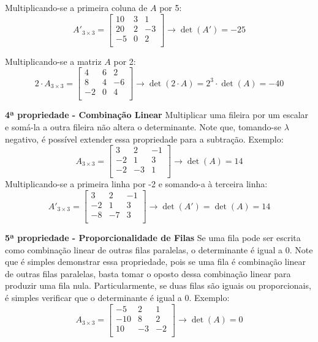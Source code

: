 \documentclass[
  portuguese,
  letterpaper,
  DIV=11,
  numbers=noendperiod]{scrreport}
\begin{document}
Multiplicando-se a primeira coluna de \(A\) por 5: \[
A'_{3\times3} =
\begin{bmatrix}
    10 & 3 & 1  \\
    20 & 2 & -3 \\
    -5 & 0 & 2 \\
\end{bmatrix}
\rightarrow \det(A') = -25
\]

Multiplicando-se a matriz \(A\) por 2: \[
2\cdot A_{3\times3} =
\begin{bmatrix}
    4 & 6 & 2  \\
    8 & 4 & -6 \\
    -2 & 0 & 4 \\
\end{bmatrix}
\rightarrow \det(2 \cdot A) = 2^3 \cdot \det(A) = -40
\]

\textbf{4ª propriedade - Combinação Linear} Multiplicar uma fileira por
um escalar e somá-la a outra fileira não altera o determinante. Note
que, tomando-se \(\lambda\) negativo, é possível extender essa
propriedade para a subtração. Exemplo: \[
A_{3\times3} =
\begin{bmatrix}
    3 & 2 & -1  \\
    -2 & 1 & 3 \\
    -2 & -3 & 1 \\
\end{bmatrix}
\rightarrow \det(A) = 14
\] Multiplicando-se a primeira linha por -2 e somando-a à terceira
linha: \[
A'_{3\times3} =
\begin{bmatrix}
    3 & 2 & -1  \\
    -2 & 1 & 3 \\
    -8 & -7 & 3 \\
\end{bmatrix}
\rightarrow \det(A') = \det(A) = 14
\]

\textbf{5ª propriedade - Proporcionalidade de Filas} Se uma fila pode
ser escrita como combinação linear de outras filas paralelas, o
determinante é igual a \(0\). Note que é simples demonstrar essa
propriedade, pois se uma fila é combinação linear de outras filas
paralelas, basta tomar o oposto dessa combinação linear para produzir
uma fila nula. Particularmente, se duas filas são iguais ou
proporcionais, é simples verificar que o determinante é igual a \(0\).
Exemplo: \[
A_{3\times3} =
\begin{bmatrix}
    -5 & 2 & 1  \\
    -10 & 8 & 2 \\
    10 & -3 & -2 \\
\end{bmatrix}
\rightarrow \det(A) = 0
\]
\end{document}
